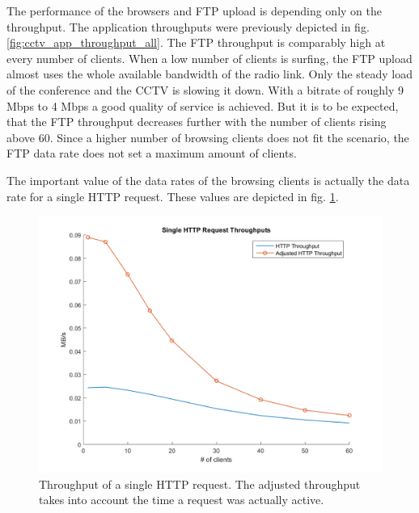 \documentclass[
10pt, %
a4paper, %
oneside, %
headinclude,footinclude, %
BCOR5mm, %
]{scrartcl}
\begin{document}
The performance of the browsers and FTP upload is depending only on the throughput. The application throughputs were previously depicted in fig. \ref{fig:cctv_app_throughput_all}.
The FTP throughput is comparably high at every number of clients. When a low number of clients is surfing, the FTP upload almost uses the whole available bandwidth of the radio link. Only the steady load of the conference and the CCTV is slowing it down. With a bitrate of roughly 9 Mbps to 4 Mbps a good quality of service is achieved. But it is to be expected, that the FTP throughput decreases further with the number of clients rising above 60. Since a higher number of browsing clients does not fit the scenario, the FTP data rate does not set a maximum amount of clients.

The important value of the data rates of the browsing clients is actually the data rate for a single HTTP request. These values are depicted in fig. \ref{fig:cctv_http_request_throughput}.
\begin{figure}[!ht]
  \centering
  \includegraphics[width=\textwidth]{Figures/cctv/Single_HTTP_Request_Throughputs.png}
  \caption{Throughput of a single HTTP request. The adjusted throughput takes into account the time a request was actually active.} \label{fig:cctv_http_request_throughput}
\end{figure}
\end{document}
